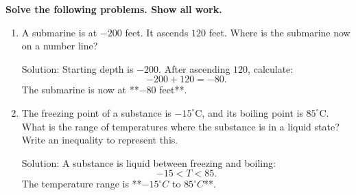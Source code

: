 \documentclass[12pt]{article}
\begin{document}
\begin{tcolorbox}[colframe=black!60, colback=white, 
coltitle=black, colbacktitle=black!15, fonttitle=\bfseries\Large, 
title=Problems (Part 1), halign title=center, left=10pt, right=10pt, top=10pt, bottom=40pt]
\textbf{Solve the following problems. Show all work.}

\begin{enumerate}[start=9, itemsep=5em]

   \item A submarine is at \( -200 \) feet. It ascends \( 120 \) feet. Where is the submarine now on a number line?


    {\color{red} Solution: Starting depth is \( -200 \). After ascending \( 120 \), calculate:
    \[
    -200 + 120 = -80.
    \]
    The submarine is now at **\(-80\) feet**.}

    \item The freezing point of a substance is \( -15^\circ \text{C} \), and its boiling point is \( 85^\circ \text{C} \). What is the range of temperatures where the substance is in a liquid state? Write an inequality to represent this.

    {\color{red} Solution: A substance is liquid between freezing and boiling:
    \[
    -15 < T < 85.
    \]
    The temperature range is **\(-15^\circ C\) to \( 85^\circ C\)**.}
    
\end{enumerate}
\end{tcolorbox}

\vspace{1em}
\end{document}
